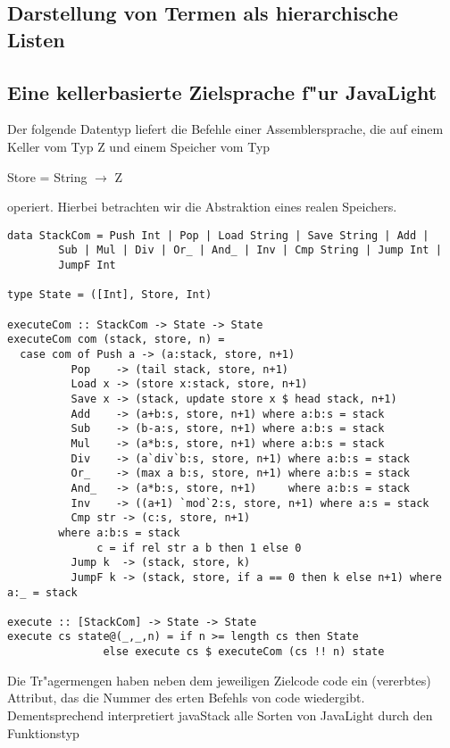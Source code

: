 \documentclass[11pt]{article}
\begin{document}
\subsection{Darstellung von Termen als hierarchische Listen}
\label{sec-12-4}
\subsection{Eine kellerbasierte Zielsprache f"ur JavaLight}
\label{sec-12-5}
Der folgende Datentyp liefert die Befehle einer Assemblersprache, die auf einem Keller vom Typ Z und einem Speicher vom Typ
\begin{center}
Store = String $\to$ Z
\end{center}
operiert. Hierbei betrachten wir die Abstraktion eines realen Speichers.

\begin{verbatim}
data StackCom = Push Int | Pop | Load String | Save String | Add |
		Sub | Mul | Div | Or_ | And_ | Inv | Cmp String | Jump Int |
		JumpF Int

type State = ([Int], Store, Int)

executeCom :: StackCom -> State -> State
executeCom com (stack, store, n) =
  case com of Push a -> (a:stack, store, n+1)
	      Pop    -> (tail stack, store, n+1)
	      Load x -> (store x:stack, store, n+1)
	      Save x -> (stack, update store x $ head stack, n+1)
	      Add    -> (a+b:s, store, n+1) where a:b:s = stack
	      Sub    -> (b-a:s, store, n+1) where a:b:s = stack
	      Mul    -> (a*b:s, store, n+1) where a:b:s = stack
	      Div    -> (a`div`b:s, store, n+1) where a:b:s = stack
	      Or_    -> (max a b:s, store, n+1) where a:b:s = stack
	      And_   -> (a*b:s, store, n+1)     where a:b:s = stack
	      Inv    -> ((a+1) `mod`2:s, store, n+1) where a:s = stack
	      Cmp str -> (c:s, store, n+1)
		where a:b:s = stack
		      c = if rel str a b then 1 else 0
	      Jump k  -> (stack, store, k)
	      JumpF k -> (stack, store, if a == 0 then k else n+1) where a:_ = stack

execute :: [StackCom] -> State -> State
execute cs state@(_,_,n) = if n >= length cs then State
			   else execute cs $ executeCom (cs !! n) state
\end{verbatim}

Die Tr"agermengen haben neben dem jeweiligen Zielcode code ein (vererbtes) Attribut, das die Nummer des erten Befehls von code
wiedergibt. Dementsprechend interpretiert javaStack alle Sorten von JavaLight durch den Funktionstyp
\end{document}
